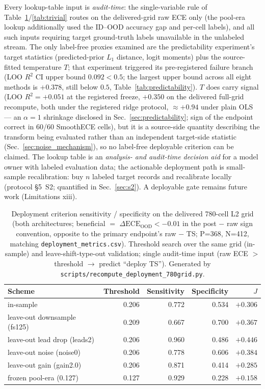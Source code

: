 \documentclass[review,12pt,nonatbib]{elsarticle}
\begin{document}
Every lookup-table input is
\emph{audit-time}: the single-variable rule of
Table~\ref{tab:deploy_sens}/\ref{tab:trivial} routes on the delivered-grid
raw ECE only (the pool-era lookup additionally used the ID--OOD accuracy
gap and per-cell labels), and all such inputs
requiring target ground-truth labels unavailable in the unlabeled stream. The only label-free proxies examined are the predictability
experiment's target statistics (predicted-prior $L_1$ distance, logit
moments) plus the source-fitted temperature $T$; that experiment
triggered its pre-registered failure branch
(LOO $R^2$ CI upper bound $0.092 < 0.5$; the largest upper bound across
all eight methods is $+0.378$, still below $0.5$,
Table~\ref{tab:predictability}).
$T$ does carry signal (LOO $R^2 = +0.051$ at the registered freeze,
$+0.350$ on the delivered full-grid recompute, both under the registered ridge
protocol, $\approx+0.94$ under plain OLS --- an $\alpha{=}1$ shrinkage
disclosed in Sec.~\ref{sec:predictability}; sign of the endpoint correct
in 60/60 SmoothECE cells),
but it is a source-side quantity describing the
transform being evaluated rather than an independent target-side
statistic (Sec.~\ref{sec:noise_mechanism}), so no label-free deployable
criterion can be claimed. The lookup table is
an \emph{analysis- and audit-time decision aid} for a model owner with
labeled evaluation data; the actionable deployment path is small-sample
recalibration: buy $n$ labeled target records and recalibrate locally
(protocol \S5~S2; quantified in Sec.~\ref{sec:s2}). A deployable gate
remains future work
(Limitations xiii).

\begin{table}[t]
\centering
\caption{Deployment criterion sensitivity / specificity on the delivered
780-cell L2 grid (both architectures; beneficial $=$
$\Delta\text{ECE}_{\text{OOD}}<-0.01$ in the post $-$ raw sign
convention, opposite to the primary endpoint's raw $-$ TS; P=368,
N=412, matching
\texttt{deployment\_metrics.csv}). Threshold search over the same grid
(in-sample) and leave-shift-type-out validation; single audit-time input
(raw ECE $>$ threshold $\rightarrow$ predict ``deploy TS''). Generated by
\texttt{scripts/recompute\_deployment\_780grid.py}.}
\label{tab:deploy_sens}
\begin{tabular}{lrrrr}
\toprule
Scheme & Threshold & Sensitivity & Specificity & $J$ \\
\midrule
in-sample                & 0.206 & 0.772 & 0.534 & $+0.306$ \\
leave-out downsample (fs125)  & 0.209 & 0.667 & 0.700 & $+0.367$ \\
leave-out lead drop (leads2)  & 0.206 & 0.960 & 0.486 & $+0.446$ \\
leave-out noise (noise0)      & 0.206 & 0.778 & 0.606 & $+0.384$ \\
leave-out gain (gain2.0)      & 0.206 & 0.871 & 0.414 & $+0.285$ \\
frozen pool-era (0.127)  & 0.127 & 0.929 & 0.228 & $+0.158$ \\
\bottomrule
\end{tabular}
\end{table}
\end{document}
